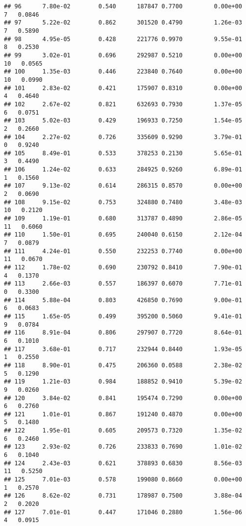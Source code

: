 \documentclass[
]{article}
\begin{document}
\begin{verbatim}
## 96      7.80e-02        0.540      187847 0.7700         0.00e+00   7   0.0846
## 97      5.22e-02        0.862      301520 0.4790         1.26e-03   7   0.5890
## 98      4.95e-05        0.428      221776 0.9970         9.55e-01   8   0.2530
## 99      3.02e-01        0.696      292987 0.5210         0.00e+00  10   0.0565
## 100     1.35e-03        0.446      223840 0.7640         0.00e+00  10   0.0990
## 101     2.83e-02        0.421      175907 0.8310         0.00e+00   4   0.4640
## 102     2.67e-02        0.821      632693 0.7930         1.37e-05   6   0.0751
## 103     5.02e-03        0.429      196933 0.7250         1.54e-05   2   0.2660
## 104     2.27e-02        0.726      335609 0.9290         3.79e-01   0   0.9240
## 105     8.49e-01        0.533      378253 0.2130         5.65e-01   3   0.4490
## 106     1.24e-02        0.633      284925 0.9260         6.89e-01   1   0.1560
## 107     9.13e-02        0.614      286315 0.8570         0.00e+00   2   0.0690
## 108     9.15e-02        0.753      324880 0.7480         3.48e-03  10   0.2120
## 109     1.19e-01        0.680      313787 0.4890         2.86e-05  11   0.6060
## 110     1.50e-01        0.695      240040 0.6150         2.12e-04   7   0.0879
## 111     4.24e-01        0.550      232253 0.7740         0.00e+00  11   0.0670
## 112     1.78e-02        0.690      230792 0.8410         7.90e-01   4   0.1370
## 113     2.66e-03        0.557      186397 0.6070         7.71e-01   0   0.3300
## 114     5.88e-04        0.803      426850 0.7690         9.00e-01   6   0.0683
## 115     1.65e-05        0.499      395200 0.5060         9.41e-01   9   0.0784
## 116     8.91e-04        0.806      297907 0.7720         8.64e-01   6   0.1010
## 117     3.68e-01        0.717      232944 0.8440         1.93e-05   1   0.2550
## 118     8.90e-01        0.475      206360 0.0588         2.38e-02   5   0.1290
## 119     1.21e-03        0.984      188852 0.9410         5.39e-02   9   0.0260
## 120     3.84e-02        0.841      195474 0.7290         0.00e+00   6   0.2760
## 121     1.01e-01        0.867      191240 0.4870         0.00e+00   5   0.1480
## 122     1.95e-01        0.605      209573 0.7320         1.35e-02   6   0.2460
## 123     2.93e-02        0.726      233833 0.7690         1.01e-02   6   0.1040
## 124     2.43e-03        0.621      378893 0.6830         8.56e-03  11   0.5250
## 125     7.01e-03        0.578      199080 0.8660         0.00e+00   1   0.2570
## 126     8.62e-02        0.731      178987 0.7500         3.88e-04   2   0.2020
## 127     7.01e-01        0.447      171046 0.2880         1.56e-06   4   0.0915

\end{verbatim}
\end{document}
